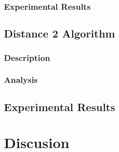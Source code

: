 \documentclass[twoside]{article}
\begin{document}
\subsubsection{Experimental Results}

\subsection{Distance 2 Algorithm}
\subsubsection{Description}




\subsubsection{Analysis}

\subsection{Experimental Results}
\label{sub:experiment-erdren-direct}

\section{Discusion}



\end{document}
